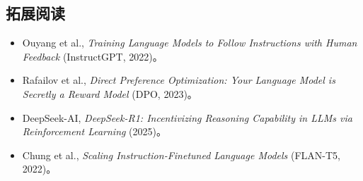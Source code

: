 \subsection{拓展阅读}
\begin{itemize}
    \item Ouyang et al., \textit{Training Language Models to Follow Instructions with Human Feedback} (InstructGPT, 2022)。
    \item Rafailov et al., \textit{Direct Preference Optimization: Your Language Model is Secretly a Reward Model} (DPO, 2023)。
    \item DeepSeek-AI, \textit{DeepSeek-R1: Incentivizing Reasoning Capability in LLMs via Reinforcement Learning} (2025)。
    \item Chung et al., \textit{Scaling Instruction-Finetuned Language Models} (FLAN-T5, 2022)。
\end{itemize}


